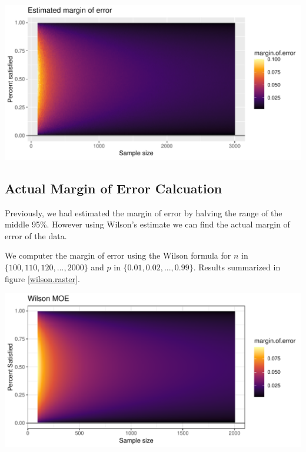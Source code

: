 \documentclass{article}\usepackage[]{graphicx}\usepackage[]{xcolor}
\newenvironment{Figure}
  {\par\medskip\noindent\minipage{\linewidth}}
  {\endminipage\par\medskip}
\begin{document}
\begin{multicols}{2}
\begin{Figure}
\begin{centering}
\includegraphics[width=1\columnwidth]{plots/Rplot4.pdf}
\end{centering}
 \label{sim.raster}
\end{Figure}

\subsection{Actual Margin of Error Calcuation}
Previously, we had estimated the margin of error by halving the range of the middle 95\%. However using Wilson's estimate we can find the actual margin of error of the data.

We computer the margin of error using the Wilson formula for $n$ in $\{100, 110, 120, ... ,2000\}$ and $p$ in $\{0.01, 0.02, ..., 0.99\}$. Results summarized in figure \ref{wilson.raster}.

\begin{Figure}
\begin{centering}
\includegraphics[width=1\columnwidth]{plots/Rplot5.pdf}
\end{centering}
 \label{wilson.raster}
\end{Figure}




\end{multicols}
\end{document}
